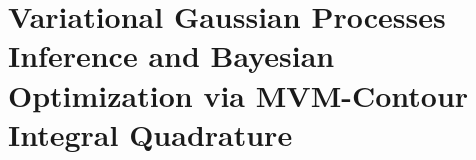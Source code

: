 \chapter{Variational Gaussian Processes Inference and Bayesian Optimization via MVM-Contour Integral Quadrature}
\label{chapter:ciq}








